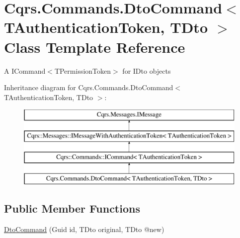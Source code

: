 \hypertarget{classCqrs_1_1Commands_1_1DtoCommand}{}\section{Cqrs.\+Commands.\+Dto\+Command$<$ T\+Authentication\+Token, T\+Dto $>$ Class Template Reference}
\label{classCqrs_1_1Commands_1_1DtoCommand}


A I\+Command$<$\+T\+Permission\+Token$>$ for I\+Dto objects  


Inheritance diagram for Cqrs.\+Commands.\+Dto\+Command$<$ T\+Authentication\+Token, T\+Dto $>$\+:\begin{figure}[H]
\begin{center}
\leavevmode
\includegraphics[height=4.000000cm]{classCqrs_1_1Commands_1_1DtoCommand}
\end{center}
\end{figure}
\subsection*{Public Member Functions}
\begin{DoxyCompactItemize}
\item 
\hyperlink{classCqrs_1_1Commands_1_1DtoCommand_a705b7bdee6a242dd56821c60b4040b23}{Dto\+Command} (Guid id, T\+Dto original, T\+Dto @new)
\end{DoxyCompactItemize}
